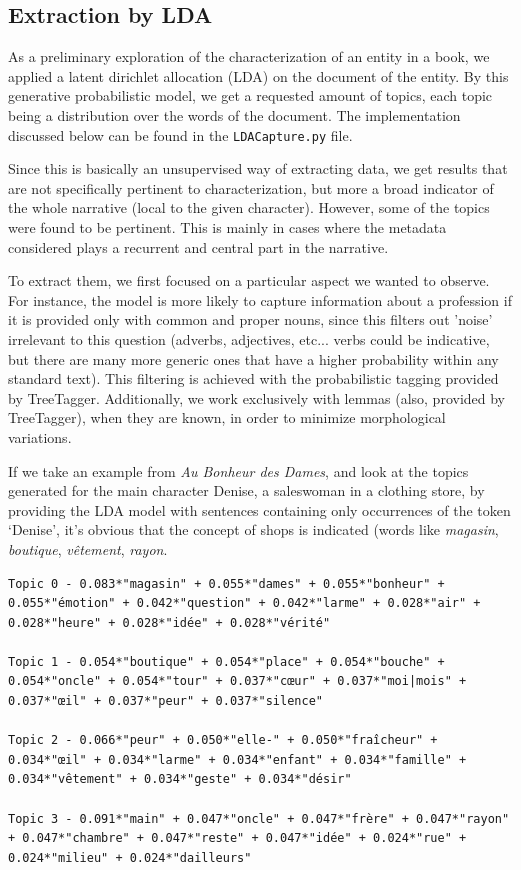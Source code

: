 \subsection{Extraction by LDA}
As a preliminary exploration of the characterization of an entity in a book, we applied a latent dirichlet allocation (LDA) \cite{blei2003latent} on the document of the entity. By this generative probabilistic model, we get a requested amount of topics, each topic being a distribution over the words of the document. The implementation discussed below can be found in the \texttt{LDACapture.py} file.

Since this is basically an unsupervised way of extracting data, we get results that are not specifically pertinent to characterization, but more a broad indicator of the whole narrative (local to the given character). However, some of the topics were found to be pertinent. This is mainly in cases where the metadata considered plays a recurrent and central part in the narrative.

To extract them, we first focused on a particular aspect we wanted to observe. For instance, the model is more likely to capture information about a profession if it is provided only with common and proper nouns, since this filters out 'noise' irrelevant to this question (adverbs, adjectives, etc... verbs could be indicative, but there are many more generic ones that have a higher probability within any standard text). This filtering is achieved with the probabilistic tagging provided by TreeTagger. Additionally, we work exclusively with lemmas (also, provided by TreeTagger), when they are known, in order to minimize morphological variations.

If we take an example from \textit{Au Bonheur des Dames}, and look at the topics generated for the main character Denise, a saleswoman in a clothing store, by providing the LDA model with sentences containing only occurrences of the token `Denise', it's obvious that the concept of shops is indicated (words like \textit{magasin}, \textit{boutique}, \textit{vêtement}, \textit{rayon}.

\begin{lstlisting}
Topic 0 - 0.083*"magasin" + 0.055*"dames" + 0.055*"bonheur" + 0.055*"émotion" + 0.042*"question" + 0.042*"larme" + 0.028*"air" + 0.028*"heure" + 0.028*"idée" + 0.028*"vérité"

Topic 1 - 0.054*"boutique" + 0.054*"place" + 0.054*"bouche" + 0.054*"oncle" + 0.054*"tour" + 0.037*"cœur" + 0.037*"moi|mois" + 0.037*"œil" + 0.037*"peur" + 0.037*"silence"

Topic 2 - 0.066*"peur" + 0.050*"elle-" + 0.050*"fraîcheur" + 0.034*"œil" + 0.034*"larme" + 0.034*"enfant" + 0.034*"famille" + 0.034*"vêtement" + 0.034*"geste" + 0.034*"désir"

Topic 3 - 0.091*"main" + 0.047*"oncle" + 0.047*"frère" + 0.047*"rayon" + 0.047*"chambre" + 0.047*"reste" + 0.047*"idée" + 0.024*"rue" + 0.024*"milieu" + 0.024*"dailleurs"
\end{lstlisting}

